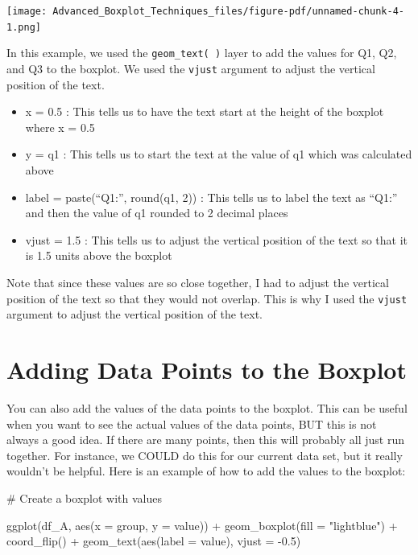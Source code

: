 \documentclass[
  letterpaper,
  DIV=11,
  numbers=noendperiod]{scrreprt}
\newenvironment{Shaded}{\begin{snugshade}}{\end{snugshade}}
\newcommand{\AttributeTok}[1]{\textcolor[rgb]{0.40,0.45,0.13}{#1}}
\newcommand{\CommentTok}[1]{\textcolor[rgb]{0.37,0.37,0.37}{#1}}
\newcommand{\FloatTok}[1]{\textcolor[rgb]{0.68,0.00,0.00}{#1}}
\newcommand{\FunctionTok}[1]{\textcolor[rgb]{0.28,0.35,0.67}{#1}}
\newcommand{\NormalTok}[1]{\textcolor[rgb]{0.00,0.23,0.31}{#1}}
\newcommand{\SpecialCharTok}[1]{\textcolor[rgb]{0.37,0.37,0.37}{#1}}
\newcommand{\StringTok}[1]{\textcolor[rgb]{0.13,0.47,0.30}{#1}}
\providecommand{\tightlist}{%
  \setlength{\itemsep}{0pt}\setlength{\parskip}{0pt}}\usepackage{longtable,booktabs,array}
\begin{document}
\begin{center}
\texttt{[image: Advanced\_Boxplot\_Techniques\_files/figure-pdf/unnamed-chunk-4-1.png]}
\end{center}

In this example, we used the \texttt{geom\_text(\ )} layer to add the
values for Q1, Q2, and Q3 to the boxplot. We used the \texttt{vjust}
argument to adjust the vertical position of the text.

\begin{itemize}
\tightlist
\item
  x = 0.5 : This tells us to have the text start at the height of the
  boxplot where x = 0.5
\item
  y = q1 : This tells us to start the text at the value of q1 which was
  calculated above
\item
  label = paste(``Q1:'', round(q1, 2)) : This tells us to label the text
  as ``Q1:'' and then the value of q1 rounded to 2 decimal places
\item
  vjust = 1.5 : This tells us to adjust the vertical position of the
  text so that it is 1.5 units above the boxplot
\end{itemize}

Note that since these values are so close together, I had to adjust the
vertical position of the text so that they would not overlap. This is
why I used the \texttt{vjust} argument to adjust the vertical position
of the text.

\section*{Adding Data Points to the
Boxplot}\label{adding-data-points-to-the-boxplot}


You can also add the values of the data points to the boxplot. This can
be useful when you want to see the actual values of the data points, BUT
this is not always a good idea. If there are many points, then this will
probably all just run together. For instance, we COULD do this for our
current data set, but it really wouldn't be helpful. Here is an example
of how to add the values to the boxplot:

\begin{Shaded}
\begin{Highlighting}[]
\CommentTok{\# Create a boxplot with values}

\FunctionTok{ggplot}\NormalTok{(df\_A, }\FunctionTok{aes}\NormalTok{(}\AttributeTok{x =}\NormalTok{ group, }\AttributeTok{y =}\NormalTok{ value)) }\SpecialCharTok{+}
  \FunctionTok{geom\_boxplot}\NormalTok{(}\AttributeTok{fill =} \StringTok{"lightblue"}\NormalTok{) }\SpecialCharTok{+}
  \FunctionTok{coord\_flip}\NormalTok{() }\SpecialCharTok{+}
  \FunctionTok{geom\_text}\NormalTok{(}\FunctionTok{aes}\NormalTok{(}\AttributeTok{label =}\NormalTok{ value), }\AttributeTok{vjust =} \SpecialCharTok{{-}}\FloatTok{0.5}\NormalTok{)}
\end{Highlighting}
\end{Shaded}
\end{document}
